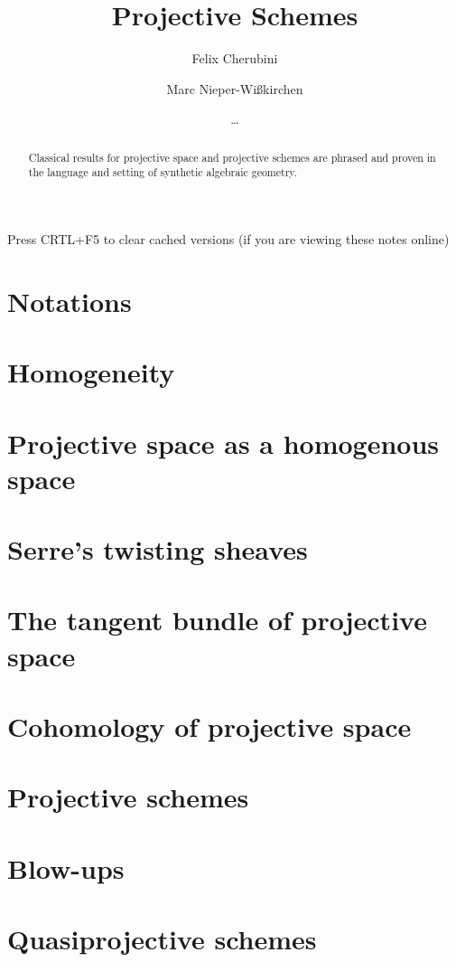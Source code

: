 \documentclass{../util/zariski}
\title{Projective Schemes}
\author{Felix Cherubini \and Marc Nieper-Wi\ss{}kirchen \and \dots}
\begin{document}
\maketitle

\begin{center}
  \color{purple}
  \large{Press CRTL+F5 to clear cached versions}
  \large{(if you are viewing these notes online)}
\end{center}

\begin{abstract}
  Classical results for projective space and projective schemes are
  phrased and proven in the language and setting of synthetic
  algebraic geometry.
\end{abstract}

\tableofcontents

\section{Notations}


\section{Homogeneity}


\section{Projective space as a homogenous space}

\section{Serre's twisting sheaves}

\section{The tangent bundle of projective space}

\section{Cohomology of projective space}

\section{Projective schemes}

\section{Blow-ups}

\section{Quasiprojective schemes}

\printindex

\printbibliography
\end{document}

